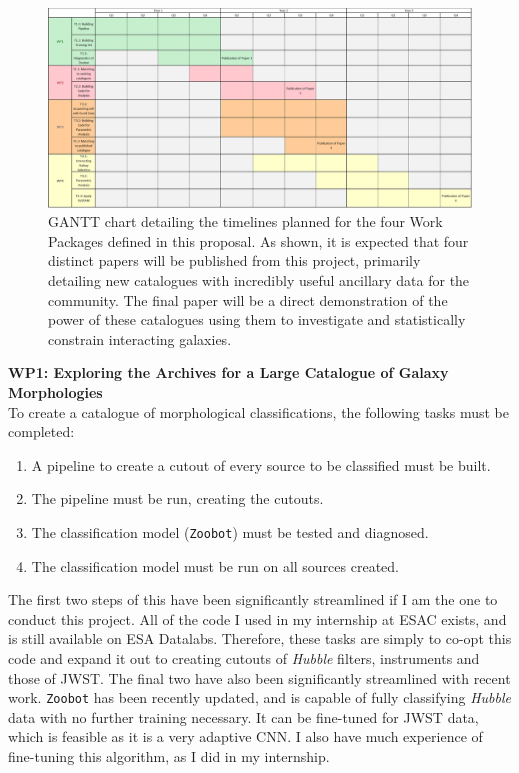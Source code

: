 \documentclass[11pt,usenatbib]{article}
\begin{document}
\begin{figure}
    \centering
    \includegraphics[width = \textwidth]{figures/draft-gantt.png}
    \caption{GANTT chart detailing the timelines planned for the four Work Packages defined in this proposal. As shown, it is expected that four distinct papers will be published from this project, primarily detailing new catalogues with incredibly useful ancillary data for the community. The final paper will be a direct demonstration of the power of these catalogues using them to investigate and statistically constrain interacting galaxies.}
    \label{fig:gantt-chart}
\end{figure}

\noindent \textbf{WP1: Exploring the Archives for a Large Catalogue of Galaxy Morphologies} \\
\noindent To create a catalogue of morphological classifications, the following tasks must be completed:
\begin{enumerate}[itemsep=0pt, parsep=0pt, topsep=2pt]
    \item A pipeline to create a cutout of every source to be classified must be built.
    \item The pipeline must be run, creating the cutouts.
    \item The classification model (\texttt{Zoobot}) must be tested and diagnosed.
    \item The classification model must be run on all sources created.
\end{enumerate}
The first two steps of this have been significantly streamlined if I am the one to conduct this project. All of the code I used in my internship at ESAC exists, and is still available on ESA Datalabs. Therefore, these tasks are simply to co-opt this code and expand it out to creating cutouts of \textit{Hubble} filters, instruments and those of JWST. The final two have also been significantly streamlined with recent work. \texttt{Zoobot} has been recently updated, and is capable of fully classifying \textit{Hubble} data with no further training necessary. It can be fine-tuned for JWST data, which is feasible as it is a very adaptive CNN. I also have much experience of fine-tuning this algorithm, as I did in my internship. \\
\end{document}
